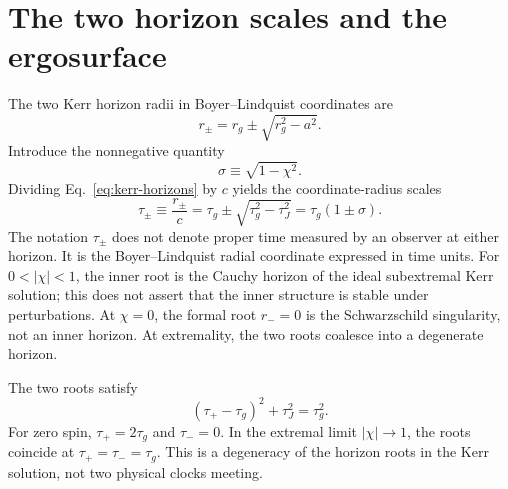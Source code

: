 \documentclass[12pt]{article}
\begin{document}
\section{The two horizon scales and the ergosurface}

The two Kerr horizon radii in Boyer--Lindquist coordinates are \cite{BardeenPressTeukolsky}
\begin{equation}
  r_\pm=r_g\pm\sqrt{r_g^2-a^2}.
  \label{eq:kerr-horizons}
\end{equation}
Introduce the nonnegative quantity
\begin{equation}
  \sigma\equiv\sqrt{1-\chi^2}.
  \label{eq:sigma-definition}
\end{equation}
Dividing Eq.~\eqref{eq:kerr-horizons} by $c$ yields the coordinate-radius scales
\begin{equation}
  \tau_\pm\equiv\frac{r_\pm}{c}
  =\tau_g\pm\sqrt{\tau_g^2-\tau_J^2}
  =\tau_g(1\pm\sigma).
  \label{eq:horizon-times}
\end{equation}
The notation $\tau_\pm$ does not denote proper time measured by an observer at either horizon. It is the Boyer--Lindquist radial coordinate expressed in time units. For $0<|\chi|<1$, the inner root is the Cauchy horizon of the ideal subextremal Kerr solution; this does not assert that the inner structure is stable under perturbations. At $\chi=0$, the formal root $r_-=0$ is the Schwarzschild singularity, not an inner horizon. At extremality, the two roots coalesce into a degenerate horizon.

The two roots satisfy
\begin{equation}
  (\tau_+-\tau_g)^2+\tau_J^2=\tau_g^2.
  \label{eq:horizon-circle}
\end{equation}
For zero spin, $\tau_+=2\tau_g$ and $\tau_-=0$. In the extremal limit $|\chi|\to1$, the roots coincide at $\tau_+=\tau_-=\tau_g$. This is a degeneracy of the horizon roots in the Kerr solution, not two physical clocks meeting.
\end{document}
